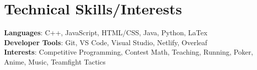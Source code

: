 \documentclass[letterpaper,11pt]{article}
\begin{document}
%
\section{Technical Skills/Interests}
 \begin{itemize}[leftmargin=0.15in, label={}]
    \small{\item{
     \textbf{Languages}{: C++, JavaScript, HTML/CSS, Java, Python, LaTex  } \\
     \textbf{Developer Tools}{: Git, VS Code, Visual Studio, Netlify, Overleaf} \\
    \textbf{Interests}{: Competitive Programming, Contest Math, Teaching, Running, Poker, Anime, Music, Teamfight Tactics}
    }}
 \end{itemize}


\end{document}
